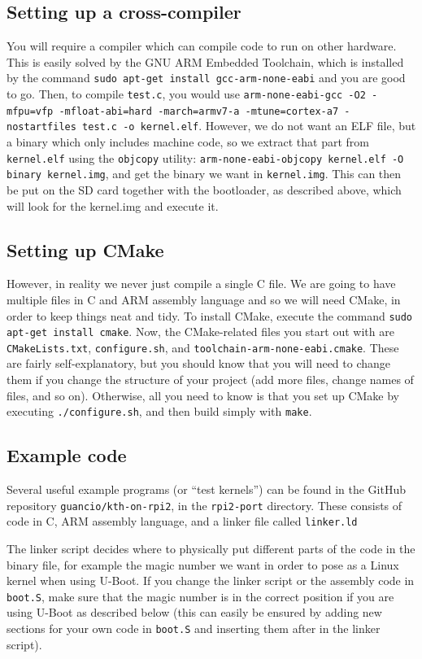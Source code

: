 \documentclass[a4paper,11pt,reqno]{amsart}
\begin{document}
\subsection{Setting up a cross-compiler}
You will require a compiler which can compile code to run on other hardware. This is easily solved by the GNU ARM Embedded Toolchain, which is installed by the command \texttt{sudo apt-get install gcc-arm-none-eabi} and you are good to go. Then, to compile \texttt{test.c}, you would use \texttt{arm-none-eabi-gcc -O2 -mfpu=vfp -mfloat-abi=hard -march=armv7-a -mtune=cortex-a7 -nostartfiles test.c -o kernel.elf}. However, we do not want an ELF file, but a binary which only includes machine code, so we extract that part from \texttt{kernel.elf} using the \texttt{objcopy} utility: \texttt{arm-none-eabi-objcopy kernel.elf -O binary kernel.img}, and get the binary we want in \texttt{kernel.img}. This can then be put on the SD card together with the bootloader, as described above, which will look for the kernel.img and execute it.

\subsection{Setting up CMake}
However, in reality we never just compile a single C file. We are going to have multiple files in C and ARM assembly language and so we will need CMake, in order to keep things neat and tidy. To install CMake, execute the command \texttt{sudo apt-get install cmake}. Now, the CMake-related files you start out with are \texttt{CMakeLists.txt}, \texttt{configure.sh}, and \texttt{toolchain-arm-none-eabi.cmake}. These are fairly self-explanatory, but you should know that you will need to change them if you change the structure of your project (add more files, change names of files, and so on). Otherwise, all you need to know is that you set up CMake by executing \texttt{./configure.sh}, and then build simply with \texttt{make}. 

\subsection{Example code}
Several useful example programs (or ``test kernels'') can be found in the GitHub repository \texttt{guancio/kth-on-rpi2}, in the \texttt{rpi2-port} directory. These consists of code in C, ARM assembly language, and a linker file called \texttt{linker.ld}

The linker script decides where to physically put different parts of the code in the binary file, for example the magic number we want in order to pose as a Linux kernel when using U-Boot. If you change the linker script or the assembly code in \texttt{boot.S}, make sure that the magic number is in the correct position if you are using U-Boot as described below (this can easily be ensured by adding new sections for your own code in \texttt{boot.S} and inserting them after  in the linker script).
\end{document}
